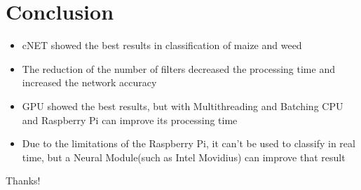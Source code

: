 \documentclass[10pt,a4paper]{proc}
\begin{document}
\section{Conclusion}
\begin{itemize}
\item cNET showed the best results in classification of maize and weed
\item The reduction of the number of filters decreased the processing time and increased the network accuracy 
\item GPU showed the best results, but with Multithreading and Batching CPU and Raspberry Pi can improve its processing time
\item Due to the limitations of the Raspberry Pi, it can't be used to classify in real time, but a Neural Module(such as Intel Movidius) can improve that result
\end{itemize}
Thanks!
\end{document}
